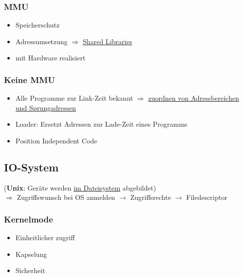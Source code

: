\subsubsection{MMU}
\begin{itemize}
	\item Speicherschutz
	\item Adressumsetzung $\Rightarrow$ \underline{Shared Libraries}
	\item mit Hardware realisiert
\end{itemize}

\subsubsection{Keine MMU}
\begin{itemize}
	\item Alle Programme zur Link-Zeit bekannt $\Rightarrow$ \underline{zuordnen von Adressbereichen und Sprungadressen}
	\item Loader: Ersetzt Adressen zur Lade-Zeit eines Programms
	\item Position Independent Code
\end{itemize}

\subsection{IO-System}
(\textbf{Unix}: Geräte werden \underline{im Dateisystem} abgebildet) \\
$\Rightarrow$ Zugriffswunsch bei OS anmelden $\rightarrow$ Zugriffsrechte $\rightarrow$ Filedescriptor

\subsubsection{Kernelmode}
\begin{itemize}
	\item Einheitlicher zugriff
	\item Kapselung
	\item Sicherheit
\end{itemize}

